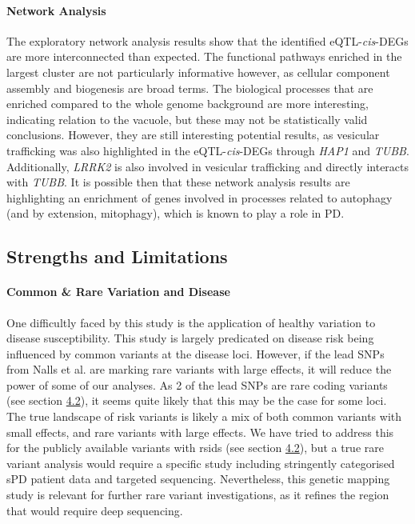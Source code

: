 \documentclass{article}
\begin{document}
\paragraph{Network Analysis}
The exploratory network analysis results show that the identified eQTL-\textit{cis}-DEGs are more interconnected than expected. The functional pathways enriched in the largest cluster are not particularly informative however, as cellular component assembly and biogenesis are broad terms. The biological processes that are enriched compared to the whole genome background are more interesting, indicating relation to the vacuole, but these may not be statistically valid conclusions. However, they are still interesting potential results, as vesicular trafficking was also highlighted in the eQTL-\textit{cis}-DEGs through \textit{HAP1} and \textit{TUBB}. Additionally, \textit{LRRK2} is also involved in vesicular trafficking\cite{Usmani2021TheDisease} and directly interacts with \textit{TUBB}\cite{Law2014AAcetylation}. It is possible then that these network analysis results are highlighting an enrichment of genes involved in processes related to autophagy (and by extension, mitophagy), which is known to play a role in PD\cite{Lizama2021NeuronalDisease}.
\subsection{Strengths and Limitations}
\paragraph{Common \& Rare Variation and Disease}
One difficultly faced by this study is the application of healthy variation to disease susceptibility. This study is largely predicated on disease risk being influenced by common variants at the disease loci. However, if the lead SNPs from Nalls et al.\cite{Nalls2019IdentificationStudies} are marking rare variants with large effects, it will reduce the power of some of our analyses. As 2 of the lead SNPs are rare coding variants (see section \hyperref[subsec:codingvariants]{4.2}), it seems quite likely that this may be the case for some loci. The true landscape of risk variants is likely a mix of both common variants with small effects, and rare variants with large effects. We have tried to address this for the publicly available variants with rsids (see section \hyperref[subsec:codingvariants]{4.2}), but a true rare variant analysis would require a specific study including stringently categorised sPD patient data and targeted sequencing. Nevertheless, this genetic mapping study is relevant for further rare variant investigations, as it refines the region that would require deep sequencing.
\end{document}
